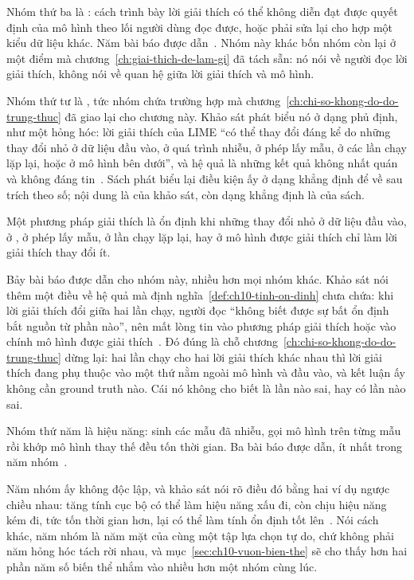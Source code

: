 Nhóm thứ ba là : cách trình bày lời
giải thích có thể không
diễn đạt được quyết định của mô hình theo lối người dùng đọc được, hoặc phải sửa
lại cho hợp một kiểu dữ liệu khác. Năm bài báo được
dẫn~\autocite{p22whichlime}. Nhóm này khác bốn
nhóm còn lại ở một điểm mà chương~\ref{ch:giai-thich-de-lam-gi} đã tách sẵn: nó nói về
người đọc lời giải thích, không nói về quan hệ giữa lời giải thích và mô hình.

%
Nhóm thứ tư là , tức nhóm chứa trường hợp mà
chương~\ref{ch:chi-so-khong-do-do-trung-thuc} đã giao lại cho chương này. Khảo
sát phát biểu nó ở dạng phủ định, như một hỏng hóc: lời giải thích của LIME
\enquote{có thể thay đổi đáng kể do những thay đổi nhỏ ở dữ liệu đầu vào, ở quá
trình nhiễu, ở phép lấy mẫu, ở các lần chạy lặp lại, hoặc ở mô hình bên dưới},
và hệ quả là những kết quả không nhất quán và không đáng
tin~\autocite{p22whichlime}. Sách phát biểu lại điều kiện ấy ở dạng khẳng định
để về sau trích theo số; nội dung là của khảo sát, còn dạng khẳng định là của
sách.

\begin{definition}
\label{def:ch10-tinh-on-dinh}
Một phương pháp giải thích là ổn định khi những thay đổi nhỏ ở dữ liệu đầu vào,
ở , ở phép lấy mẫu, ở lần chạy lặp lại, hay ở mô
hình được giải thích chỉ làm lời giải thích thay đổi ít.
\end{definition}

Bảy bài báo được dẫn cho nhóm này, nhiều hơn mọi nhóm khác. Khảo sát nói thêm
một điều về hệ quả mà định nghĩa~\ref{def:ch10-tinh-on-dinh} chưa chứa: khi lời
giải thích đổi giữa hai lần chạy, người đọc \enquote{không biết được sự bất ổn
định bắt nguồn từ phần nào}, nên mất lòng tin vào phương pháp giải thích hoặc
vào chính mô hình được giải thích~\autocite{p22whichlime}. Đó đúng là chỗ
chương~\ref{ch:chi-so-khong-do-do-trung-thuc} dừng lại: hai lần chạy cho hai lời
giải thích khác nhau thì lời giải thích đang phụ thuộc vào một thứ nằm ngoài mô
hình và đầu vào, và kết luận ấy không cần ground truth nào. Cái nó không cho
biết là lần nào sai, hay có lần nào sai.

Nhóm thứ năm là hiệu năng: sinh các mẫu đã nhiễu, gọi mô hình trên từng mẫu rồi
khớp mô hình thay thế đều tốn thời gian. Ba bài báo được dẫn, ít nhất trong năm
nhóm~\autocite{p22whichlime}.

Năm nhóm ấy không độc lập, và khảo sát nói rõ điều đó bằng hai ví dụ ngược
chiều nhau: tăng tính cục bộ có thể làm hiệu năng xấu đi, còn chịu hiệu năng
kém đi, tức tốn thời gian hơn, lại có thể làm tính ổn định tốt
lên~\autocite{p22whichlime}. Nói cách khác, năm
nhóm là năm mặt của cùng một tập lựa chọn tự do, chứ không phải năm hỏng hóc
tách rời nhau, và mục~\ref{sec:ch10-vuon-bien-the} sẽ cho thấy hơn hai phần
năm số biến thể nhắm vào nhiều hơn một nhóm cùng lúc.
